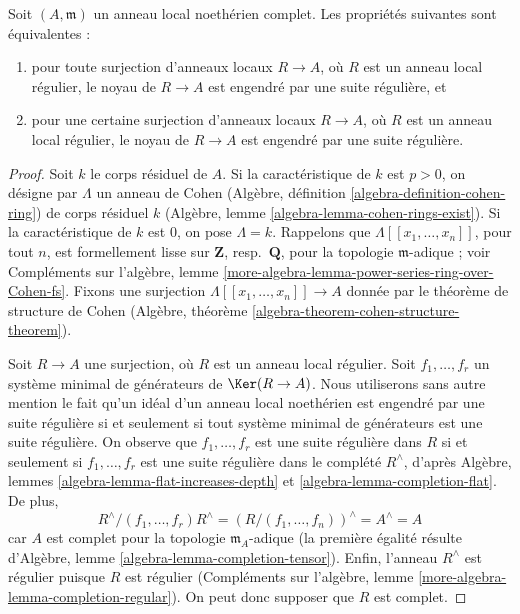 \begin{lemma}
\label{lemma-ci-well-defined}
Soit $(A, \mathfrak m)$ un anneau local noethérien complet.
Les propriétés suivantes sont équivalentes :
\begin{enumerate}
\item pour toute surjection d'anneaux locaux $R \to A$, où $R$
est un anneau local régulier, le noyau de $R \to A$ est engendré
par une suite régulière, et
\item pour une certaine surjection d'anneaux locaux $R \to A$, où $R$
est un anneau local régulier, le noyau de $R \to A$ est engendré
par une suite régulière.
\end{enumerate}
\end{lemma}

\begin{proof}
Soit $k$ le corps résiduel de $A$. Si la caractéristique de
$k$ est $p > 0$, on désigne par $\Lambda$ un anneau de Cohen
(Algèbre, définition \ref{algebra-definition-cohen-ring})
de corps résiduel $k$ (Algèbre, lemme
\ref{algebra-lemma-cohen-rings-exist}).
Si la caractéristique de $k$ est $0$, on pose $\Lambda = k$.
Rappelons que $\Lambda[[x_1, \ldots, x_n]]$, pour tout $n$,
est formellement lisse sur $\mathbf{Z}$, resp.\ $\mathbf{Q}$,
pour la topologie $\mathfrak m$-adique ; voir
Compléments sur l'algèbre, lemme
\ref{more-algebra-lemma-power-series-ring-over-Cohen-fs}.
Fixons une surjection $\Lambda[[x_1, \ldots, x_n]] \to A$ donnée par
le théorème de structure de Cohen
(Algèbre, théorème \ref{algebra-theorem-cohen-structure-theorem}).

\medskip\noindent
Soit $R \to A$ une surjection, où $R$ est un anneau local régulier.
Soit $f_1, \ldots, f_r$ un système minimal de générateurs
de $\Ker(R \to A)$. Nous utiliserons sans autre mention
le fait qu'un idéal d'un anneau local noethérien est engendré par une suite
régulière si et seulement si tout système minimal de générateurs est une
suite régulière. On observe que $f_1, \ldots, f_r$
est une suite régulière dans $R$ si et seulement si $f_1, \ldots, f_r$
est une suite régulière dans le complété $R^\wedge$, d'après
Algèbre, lemmes \ref{algebra-lemma-flat-increases-depth} et
\ref{algebra-lemma-completion-flat}.
De plus,
$$
R^\wedge/(f_1, \ldots, f_r)R^\wedge =
(R/(f_1, \ldots, f_n))^\wedge = A^\wedge = A
$$
car $A$ est complet pour la topologie $\mathfrak m_A$-adique
(la première égalité résulte d'Algèbre, lemme
\ref{algebra-lemma-completion-tensor}). Enfin,
l'anneau $R^\wedge$ est régulier puisque $R$ est régulier
(Compléments sur l'algèbre, lemme
\ref{more-algebra-lemma-completion-regular}).
On peut donc supposer que $R$ est complet.


\end{proof}

